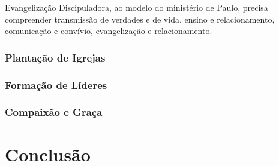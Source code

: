 \documentclass[
	12pt,				%
	openright,			%
	twoside,			%
	a4paper,			%
	english,			%
	french,				%
	spanish,			%
	brazil				%
	]{abntex2}
\begin{document}
Evangelização Discipuladora, ao modelo do ministério de Paulo, precisa compreender transmissão de verdades e de vida, ensino e relacionamento, comunicação e convívio, evangelização e relacionamento.

\subsection{Plantação de Igrejas}
\subsection{Formação de Líderes}
\subsection{Compaixão e Graça}

\chapter{Conclusão}


\end{document}
